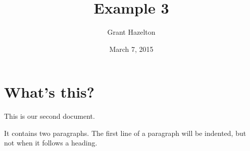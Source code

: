 \documentclass[a4paper,11pt]{article}
\begin{document}
\title{Example 3}
\author{Grant Hazelton}
\date{March 7, 2015}
\maketitle
\section{What's this?}
This            is    our
second document.

It contains two paragraphs. The first line of a paragraph will be
indented, but not when it follows a heading.
\end{document}
